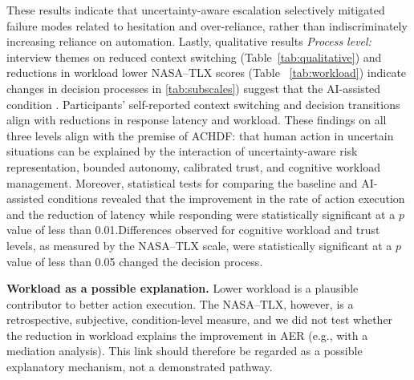 \documentclass[journal]{IEEEtran}
\theoremstyle{plain}
\theoremstyle{definition}
\providecommand{\DIFaddtex}[1]{{\protect\color{blue} \sf #1}} %
\providecommand{\DIFdeltex}[1]{{\protect\color{red} \scriptsize #1}} %
\providecommand{\DIFaddbegin}{} %
\providecommand{\DIFaddend}{} %
\providecommand{\DIFdelbegin}{} %
\providecommand{\DIFdelend}{} %
\providecommand{\DIFadd}[1]{\texorpdfstring{\DIFaddtex{#1}}{#1}} %
\providecommand{\DIFdel}[1]{\texorpdfstring{\DIFdeltex{#1}}{}} %
\newcommand{\DIFscaledelfig}{0.5}
\newlength{\DIFdelgraphicswidth} %
\newlength{\DIFdelgraphicsheight} %
\newcommand{\DIFaddincludegraphics}[2][]{{\color{blue}\fbox{\DIFOincludegraphics[#1]{#2}}}} %
\newcommand{\DIFdelincludegraphics}[2][]{%
\sbox{\DIFdelgraphicsbox}{\DIFOincludegraphics[#1]{#2}}%
\settoboxwidth{\DIFdelgraphicswidth}{\DIFdelgraphicsbox} %
\settoboxtotalheight{\DIFdelgraphicsheight}{\DIFdelgraphicsbox} %
\scalebox{\DIFscaledelfig}{%
\parbox[b]{\DIFdelgraphicswidth}{\usebox{\DIFdelgraphicsbox}\\[-\baselineskip] \rule{\DIFdelgraphicswidth}{0em}}\llap{\resizebox{\DIFdelgraphicswidth}{\DIFdelgraphicsheight}{%
\setlength{\unitlength}{\DIFdelgraphicswidth}%
\begin{picture}(1,1)%
\thicklines\linethickness{2pt} %
{\color[rgb]{1,0,0}\put(0,0){\framebox(1,1){}}}%
{\color[rgb]{1,0,0}\put(0,0){\line( 1,1){1}}}%
{\color[rgb]{1,0,0}\put(0,1){\line(1,-1){1}}}%
\end{picture}%
}\hspace*{3pt}}} %
} %
\DeclareRobustCommand{\DIFaddbegin}{\DIFOaddbegin \let\includegraphics\DIFaddincludegraphics} %
\DeclareRobustCommand{\DIFaddend}{\DIFOaddend \let\includegraphics\DIFOincludegraphics} %
\DeclareRobustCommand{\DIFdelbegin}{\DIFOdelbegin \let\includegraphics\DIFdelincludegraphics} %
\DeclareRobustCommand{\DIFdelend}{\DIFOaddend \let\includegraphics\DIFOincludegraphics} %
\begin{document}
\DIFdelbegin \DIFdel{These results indicate that uncertainty-aware escalation selectively mitigated failure modes related to hesitation and over-reliance, rather than indiscriminately increasing reliance on automation. Lastly, qualitative results }\DIFdelend \DIFaddbegin \DIFadd{\emph{Process level:} interview themes on reduced context switching }\DIFaddend (Table~\ref{tab:qualitative}) and \DIFdelbegin \DIFdel{reductions in workload }\DIFdelend \DIFaddbegin \DIFadd{lower NASA--TLX scores }\DIFaddend (Table~\DIFdelbegin \DIFdel{\ref{tab:workload}) indicate changes in decision processes in }\DIFdelend \DIFaddbegin \DIFadd{\ref{tab:subscales}) suggest that }\DIFaddend the AI-assisted condition \DIFdelbegin \DIFdel{. Participants’ self-reported context switching and decision transitions align with reductions in response latency and workload.
These findings on all three levels align with the premise of ACHDF: that human action in uncertain situations can be explained by the interaction of uncertainty-aware risk representation, bounded autonomy, calibrated trust, and cognitive workload management.
    Moreover, statistical tests for comparing the baseline and AI-assisted conditions revealed that the improvement in the rate of action execution and the reduction of latency while responding were statistically significant at a $p$ value of less than 0.01.Differences observed for cognitive workload and trust levels, as measured by the NASA--TLX scale, were statistically significant at a $p$ value of less than 0.05}\DIFdelend \DIFaddbegin \DIFadd{changed the decision process.
}

\DIFadd{\textbf{Workload as a possible explanation.} Lower workload is a plausible contributor to better action execution. The NASA--TLX, however, is a retrospective, subjective, condition-level measure, and we did not test whether the reduction in workload explains the improvement in AER (e.g., with a mediation analysis). This link should therefore be regarded as a possible explanatory mechanism, not a demonstrated pathway}\DIFaddend .
\end{document}
